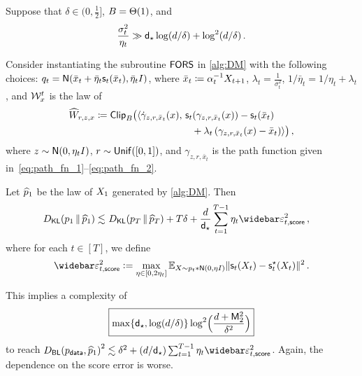 \begin{theorem}\label{thm:DM-clip-path-adapt}
Suppose that $\delta\in(0,\frac12]$, $\B=\Theta(1)$, and
\begin{align}
    \frac{\sigma_t^2}{\eta_{t}} \gg \dstar\log(d/\delta)+\log^2(d/\delta)\,.
\end{align}

Consider instantiating the subroutine $\AlgWSC$ in \cref{alg:DM} with the following choices: $q_t = \normal{\bar x_t + \bar\eta_t \scf_t(\bar x_t), \bar\eta_t I}$, where $\bar x_t \deq \alpha_t^{-1} \xr{t+1}$, $\lambda_t=\frac{1}{\sigma_t^2}$, $1/\bar\eta_t = 1/\eta_t + \lambda_t$, and $\mc W_x^t$ is the law of
\begin{align*}
    \widehat W_{r,z,x} \deq \mathsf{Clip}_B\bigl(\langle \dot \gamma_{z,r,\bar x_t}(x),&~\scf_t(\gamma_{z,r,\bar x_t}(x)) - \scf_t(\bar x_t) \\
    &\quad + \lambda_t\,(\gamma_{z,r,\bar x_t}(x) - \bar x_t)\rangle\bigr)\,,
\end{align*}
where $z\sim \normal{0,\eta_t I}$, $r\sim\Unif([0,1])$, 
and $\gamma_{z,r,\bar x_t}$ is the path function given in~\eqref{eq:path_fn_1}--\eqref{eq:path_fn_2}.

Let $\phat_1$ be the law of $\xr{1}$ generated by \cref{alg:DM}. Then
\begin{align*}
    \Dkl{p_1}{\phat_1}\leqsim&~ \kl{p_T}{\phat_T}+T\delta 
    +
    \frac{d}{\dstar}\sum_{t=1}^{T-1} \eta_t \bepssct^2\,,
\end{align*}
where for each $t\in[T]$, we define
\begin{align*}
    \bepssct[t]^2\ldef \max_{\eta\in[0,2\eta_t]}\En_{X\sim p_t*\normal{0,\eta\Id}}\nrm{\scf_t(X_t)-\scfs_t(X_t)}^2\,.
\end{align*}
\end{theorem}
This implies a complexity of
\begin{align*}
    \boxed{\max\{\dstar, \log(d/\delta)\} \log^2\prn[\Big]{ \frac{d+\mathsf M_2^2}{\delta^2}}}
\end{align*}
to reach $\Dbl{\pdata}{\wh p_1}^2 \lesssim \delta^2 + (d/\dstar) \sum_{t=1}^{T-1} \eta_t \bepssct^2$.
Again, the dependence on the score error is worse.

